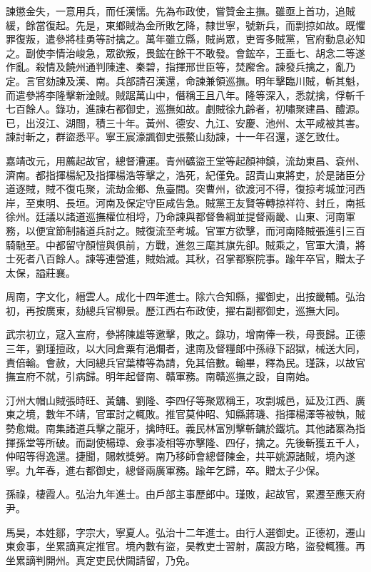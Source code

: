 \begin{pinyinscope}
諫懲金失，一意用兵，而任漢懦。先為布政使，嘗贊金主撫。雖亟上首功，追賊緩，餘當復起。先是，東鄉賊為金所敗乞降，隸世寧，號新兵，而剽掠如故。既懼罪復叛，遣參將桂勇等討擒之。萬年雖立縣，賊尚眾，吏胥多賊黨，官府動息必知之。副使李情治峻急，眾欲叛，畏鋐在餘干不敢發。會鋐卒，王垂七、胡念二等遂作亂。殺情及饒州通判陳達、秦碧，指揮邢世臣等，焚廨舍。諫發兵擒之，亂乃定。言官劾諫及漢、南。兵部請召漢還，命諫兼領巡撫。明年擊臨川賊，斬其魁，而遣參將李隆擊新淦賊。賊踞萬山中，僭稱王且八年。隆等深入，悉就擒，俘斬千七百餘人。錄功，進諫右都御史，巡撫如故。劇賊徐九齡者，初嘯聚建昌、醴源。已，出沒江、湖間，積三十年。黃州、德安、九江、安慶、池州、太平咸被其害。諫討斬之，群盜悉平。寧王宸濠諷御史張鰲山劾諫，十一年召還，遂乞致仕。

嘉靖改元，用薦起故官，總督漕運。青州礦盜王堂等起顏神鎮，流劫東昌、袞州、濟南。都指揮楊紀及指揮楊浩等擊之，浩死，紀僅免。詔責山東將吏，於是諸臣分道逐賊，賊不復屯聚，流劫金鄉、魚臺間。突曹州，欲渡河不得，復掠考城並河西岸，至東明、長垣。河南及保定守臣咸告急。賊黨王友賢等轉掠祥符、封丘，南抵徐州。廷議以諸道巡撫權位相埒，乃命諫與都督魯綱並提督兩畿、山東、河南軍務，以便宜節制諸道兵討之。賊復流至考城。官軍方欲擊，而河南降賊張進引三百騎馳至。中都留守顏愷與俱前，方戰，進忽三麾其旗先卻。賊乘之，官軍大潰，將士死者八百餘人。諫等連營進，賊始滅。其秋，召掌都察院事。踰年卒官，贈太子太保，謚莊襄。

周南，字文化，縉雲人。成化十四年進士。除六合知縣，擢御史，出按畿輔。弘治初，再按廣東，劾總兵官柳景。歷江西右布政使，擢右副都御史，巡撫大同。

武宗初立，寇入宣府，參將陳雄等邀擊，敗之。錄功，增南俸一秩，母喪歸。正德三年，劉瑾擅政，以大同倉粟有浥爛者，逮南及督糧郎中孫祿下詔獄，械送大同，責倍輸。會赦，大同總兵官葉椿等為請，免其倍數。輸畢，釋為民。瑾誅，以故官撫宣府不就，引病歸。明年起督南、贛軍務。南贛巡撫之設，自南始。

汀州大帽山賊張時旺、黃鏞、劉隆、李四仔等聚眾稱王，攻剽城邑，延及江西、廣東之境，數年不靖，官軍討之輒敗。推官莫仲昭、知縣蔣璣、指揮楊澤等被執，賊勢愈熾。南集諸道兵擊之龍牙，擒時旺。義民林富別擊斬鏞於鐵坑。其他諸寨為指揮孫堂等所破。而副使楊璋、僉事凌相等亦擊隆、四仔，擒之。先後斬獲五千人，仲昭等得逸還。捷聞，賜敕獎勞。南乃移師會總督陳金，共平姚源諸賊，境內遂寧。九年春，進右都御史，總督兩廣軍務。踰年乞歸，卒。贈太子少保。

孫祿，棲霞人。弘治九年進士。由戶部主事歷郎中。瑾敗，起故官，累遷至應天府尹。

馬昊，本姓鄒，字宗大，寧夏人。弘治十二年進士。由行人選御史。正德初，遷山東僉事，坐累謫真定推官。境內數有盜，昊教吏士習射，廣設方略，盜發輒獲。再坐累謫判開州。真定吏民伏闕請留，乃免。


\end{pinyinscope}

